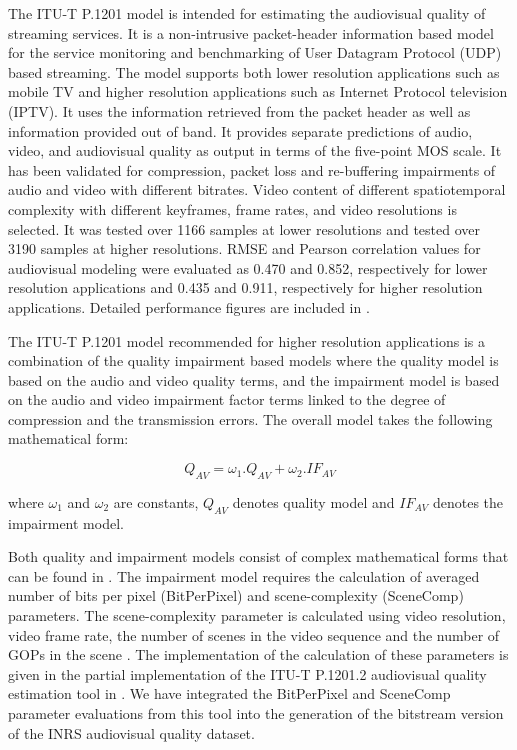 \documentclass[journal]{IEEEtran}
\begin{document}
The ITU-T P.1201 \cite{itut2012P.1201} model is intended for estimating the audiovisual quality of streaming services. It is a non-intrusive packet-header information based model for the service monitoring and benchmarking of User Datagram Protocol (UDP) based streaming.  The model supports both lower resolution applications such as mobile TV and higher resolution applications such as Internet Protocol television (IPTV). It uses the information retrieved from the packet header as well as information provided out of band. It provides separate predictions of audio, video, and audiovisual quality as output in terms of the five-point MOS scale. It has been validated for compression, packet loss and re-buffering impairments of audio and video with different bitrates. Video content of different spatiotemporal complexity with different keyframes, frame rates, and video resolutions is selected. It was tested over 1166 samples at lower resolutions and tested over 3190 samples at higher resolutions. RMSE and Pearson correlation \cite{garcia2014parametric} values for audiovisual modeling were evaluated as 0.470 and 0.852, respectively for lower resolution applications and 0.435 and 0.911, respectively for higher resolution applications. Detailed performance figures are included in  \cite{itut2012P.1201}.


The ITU-T P.1201 model recommended for higher resolution applications \cite{itut2012P.1201.2} is a combination of the quality impairment based models where the quality model is based on the audio and video quality terms, and the impairment model is based on the audio and video impairment factor terms linked to the degree of compression and the transmission errors. The overall model takes the following mathematical form:

\begin{equation}
\label{eq:p12012}
Q_{AV} = \omega_{1} .Q_{AV} + \omega_{2} .IF_{AV}
\end{equation}

where \(\omega_{1}\) and \(\omega_{2}\) are constants, \(Q_{AV}\) denotes quality model and \(IF_{AV}\) denotes the impairment model.

Both quality and impairment models consist of complex mathematical forms that can be found in \cite{itut2012P.1201.2}. The impairment model requires the calculation of averaged number of bits per pixel (BitPerPixel) and scene-complexity (SceneComp) parameters. The scene-complexity parameter is calculated using video resolution, video frame rate, the number of scenes in the video sequence and the number of GOPs in the scene \cite{itut2012P.1201.2}. The implementation of the calculation of these parameters is given in the partial implementation of the ITU-T P.1201.2 audiovisual quality estimation tool in \cite{itut2012P.1201.2_tool}. We have integrated the BitPerPixel and SceneComp parameter evaluations from this tool into the generation of the bitstream version of the INRS audiovisual quality dataset.
\end{document}
